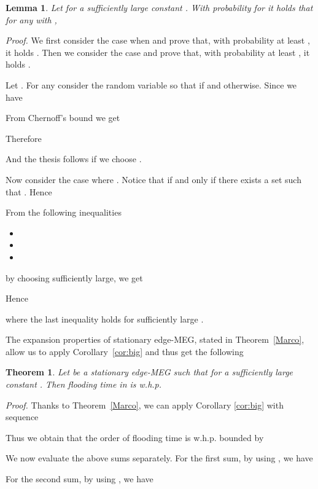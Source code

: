 \documentclass[10pt,a4paper]{article}
\newtheorem{lemma}[definition]{Lemma}
\newtheorem{theorem}[definition]{Theorem}
\newcommand{\proof}{\noindent\textit{Proof. }}
\newcommand{\qed}{\hspace{\stretch{1}}}
\begin{document}
\begin{lemma}\label{lvicinignp}
Let  for a sufficiently large constant . With probability  for  it holds that for any  with ,

\end{lemma}
\proof
We first consider the case when  and prove that, with probability at least , it holds  . Then we consider the case  and prove that, with probability at least , it holds .

\noindent Let . For any  consider the random variable  so that  if  and  otherwise. Since  we have


\noindent From Chernoff's bound we get


\noindent Therefore


\noindent And the thesis follows if we choose .

\smallskip
\noindent Now consider the case where  . Notice that  if and only if there exists a set  such that . Hence


\noindent From the following inequalities
\begin{itemize}

\item 

\item 

\item 
\end{itemize}
by choosing  sufficiently large, we get

Hence

where the last inequality holds for sufficiently large .
\qed



\noindent The expansion properties of stationary edge-MEG, stated in Theorem~\ref{Marco}, allow us to apply Corollary~\ref{cor:big} and thus get the following

\begin{theorem}\label{theorem:ubedge} Let  be a stationary edge-MEG such that  for a sufficiently large constant . Then flooding time in  is w.h.p.

\end{theorem}
\proof Thanks to Theorem~\ref{Marco}, we can apply Corollary \ref{cor:big} with sequence

Thus we obtain that the order of flooding time is w.h.p. bounded by


\noindent We now evaluate the above sums separately. For the first sum, by using
, we have


\noindent For the second sum, by using  , we have
\end{document}
